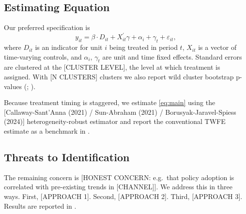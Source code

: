 \subsection{Estimating Equation}

Our preferred specification is
%
\begin{equation}\label{eq:main}
y_{it} = \beta \cdot D_{it} + X_{it}^{\prime} \gamma + \alpha_i + \gamma_t
       + \varepsilon_{it},
\end{equation}
%
where $D_{it}$ is an indicator for unit $i$ being treated in period $t$,
$X_{it}$ is a vector of time-varying controls, and $\alpha_i$, $\gamma_t$
are unit and time fixed effects. Standard errors are clustered at the
[CLUSTER LEVEL], the level at which treatment is assigned. With
[N CLUSTERS] clusters we also report wild cluster bootstrap p-values
(\citealp{CameronGelbachMiller2008}; \citealp{MacKinnonWebb2018}).

Because treatment timing is staggered, we estimate \cref{eq:main} using
the [Callaway-Sant'Anna (2021) / Sun-Abraham (2021) / Borusyak-Jaravel-Spiess
(2024)] heterogeneity-robust estimator and report the conventional TWFE
estimate as a benchmark in .

\subsection{Threats to Identification}

The remaining concern is [HONEST CONCERN: e.g.\ that policy adoption is
correlated with pre-existing trends in [CHANNEL]]. We address this in
three ways. First, [APPROACH 1]. Second, [APPROACH 2]. Third,
[APPROACH 3]. Results are reported in .
